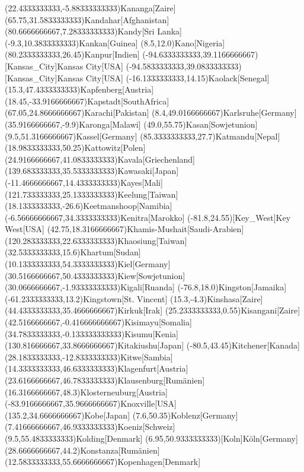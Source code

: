 \mapput(22.4333333333,-5.88333333333){Kananga}[Zaire]
\mapput(65.75,31.5833333333){Kandahar}[Afghanistan]
\mapput(80.6666666667,7.28333333333){Kandy}[Sri Lanka]
\mapput(-9.3,10.3833333333){Kankan}[Guinea]
\mapput(8.5,12.0){Kano}[Nigeria]
\mapput(80.2333333333,26.45){Kanpur}[Indien]
\mapput(-94.6333333333,39.1166666667)[Kansas_City]{Kansas City}[USA]
\mapput(-94.5833333333,39.0833333333)[Kansas_City]{Kansas City}[USA]
\mapput(-16.1333333333,14.15){Kaolack}[Senegal]
\mapput(15.3,47.4333333333){Kapfenberg}[Austria]
\mapput(18.45,-33.9166666667){Kapstadt}[SouthAfrica]
\mapput(67.05,24.8666666667){Karachi}[Pakistan]
\mapput(8.4,49.0166666667){Karlsruhe}[Germany]
\mapput(35.9166666667,-9.9){Karonga}[Malawi]
\mapput(49.0,55.75){Kasan}[Sowjetunion]
\mapput(9.5,51.3166666667){Kassel}[Germany]
\mapput(85.3333333333,27.7){Katmandu}[Nepal]
\mapput(18.9833333333,50.25){Kattowitz}[Polen]
\mapput(24.9166666667,41.0833333333){Kavala}[Griechenland]
\mapput(139.683333333,35.5333333333){Kawasaki}[Japan]
\mapput(-11.4666666667,14.4333333333){Kayes}[Mali]
\mapput(121.733333333,25.1333333333){Keelung}[Taiwan]
\mapput(18.1333333333,-26.6){Keetmanshoop}[Namibia]
\mapput(-6.56666666667,34.3333333333){Kenitra}[Marokko]
\mapput(-81.8,24.55)[Key_West]{Key West}[USA]
\mapput(42.75,18.3166666667){Khamis-Mushait}[Saudi-Arabien]
\mapput(120.283333333,22.6333333333){Khaosiung}[Taiwan]
\mapput(32.5333333333,15.6){Khartum}[Sudan]
\mapput(10.1333333333,54.3333333333){Kiel}[Germany]
\mapput(30.5166666667,50.4333333333){Kiew}[Sowjetunion]
\mapput(30.0666666667,-1.93333333333){Kigali}[Ruanda]
\mapput(-76.8,18.0){Kingston}[Jamaika]
\mapput(-61.2333333333,13.2){Kingstown}[St. Vincent]
\mapput(15.3,-4.3){Kinshasa}[Zaire]
\mapput(44.4333333333,35.4666666667){Kirkuk}[Irak]
\mapput(25.2333333333,0.55){Kisangani}[Zaire]
\mapput(42.5166666667,-0.416666666667){Kisimayu}[Somalia]
\mapput(34.7833333333,-0.133333333333){Kisumu}[Kenia]
\mapput(130.816666667,33.8666666667){Kitakiushu}[Japan]
\mapput(-80.5,43.45){Kitchener}[Kanada]
\mapput(28.1833333333,-12.8333333333){Kitwe}[Sambia]
\mapput(14.3333333333,46.6333333333){Klagenfurt}[Austria]
\mapput(23.6166666667,46.7833333333){Klausenburg}[Rumänien]
\mapput(16.3166666667,48.3){Klosterneuburg}[Austria]
\mapput(-83.9166666667,35.9666666667){Knoxville}[USA]
\mapput(135.2,34.6666666667){Kobe}[Japan]
\mapput(7.6,50.35){Koblenz}[Germany]
\mapput(7.41666666667,46.9333333333){Koeniz}[Schweiz]
\mapput(9.5,55.4833333333){Kolding}[Denmark]
\mapput(6.95,50.9333333333)[Koln]{Köln}[Germany]
\mapput(28.6666666667,44.2){Konstanza}[Rumänien]
\mapput(12.5833333333,55.6666666667){Kopenhagen}[Denmark]
